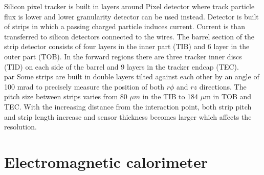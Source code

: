 Silicon pixel tracker is built in layers around Pixel detector where track particle flux is lower and lower granularity detector can be used instead. Detector is built of strips in which a passing charged particle induces current. Current is than transferred to silicon detectors connected to the wires. The barrel section of the strip detector consists of four layers in the inner part (TIB) and 6 layer in the outer part (TOB). In the forward regions there are three tracker inner discs (TID) on each side of the barrel and 9 layers in the tracker endcap (TEC). 
\\par Some strips are built in double layers tilted against each other by an angle of 100 mrad to precisely measure the position of both $r\phi$ and $rz$ directions. The pitch size between strips varies from 80 $\mu m$ in the TIB to 184 $\mu$m in TOB and TEC. With the increasing distance from the interaction point, both strip pitch and strip length increase and sensor thickness becomes larger which affects the resolution.    


\section{Electromagnetic calorimeter}

